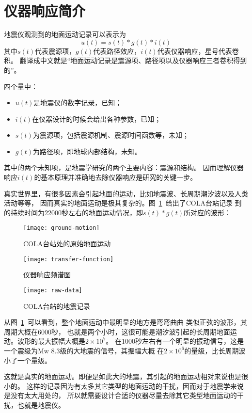 \section{仪器响应简介}
地震仪观测到的地面运动记录可以表示为
\[  u(t) = s(t) * g(t) * i(t) \]
其中$s(t)$代表震源项，$g(t)$代表路径效应，$i(t)$代表仪器响应，星号代表卷积。
翻译成中文就是“地面运动记录是震源项、路径项以及仪器响应三者卷积得到的”。

四个量中：
\begin{itemize}
\item $u(t)$是地震仪的数字记录，已知；
\item $i(t)$在仪器设计的时候会给出各种参数，已知；
\item $s(t)$为震源项，包括震源机制、震源时间函数等，未知；
\item $g(t)$为路径项，即地球内部结构，未知。
\end{itemize}
其中的两个未知项，是地震学研究的两个主要内容：震源和结构。
因而理解仪器响应$i(t)$的基本原理并准确地去除仪器响应是研究的关键一步。

真实世界里，有很多因素会引起地面的运动，比如地震波、长周期潮汐波以及人类活动等等，
因而真实的地面运动是极其复杂的。图~\ref{fig:ground-motion}~给出了COLA台站记录
到的持续时间为22000秒左右的地面运动情况，即$s(t)*g(t)$所对应的波形：

\begin{figure}[H]
\centering
\texttt{[image: ground-motion]}
\caption{COLA台站处的原始地面运动}
\label{fig:ground-motion}
\end{figure}

\begin{figure}[H]
\centering
\texttt{[image: transfer-function]}
\caption{仪器响应频谱图}
\label{fig:transfer-function}
\end{figure}

\begin{figure}[H]
\centering
\texttt{[image: raw-data]}
\caption{COLA台站的地震记录}
\end{figure}

从图~\ref{fig:ground-motion}~可以看到，整个地面运动中最明显的地方是弯弯曲曲
类似正弦的波形，其周期大概在6000秒，
也就是两个小时，这很可能是潮汐波引起的长周期地面运动。波形的最大振幅大概是$2\times10^7$。
在1000秒左右有一个明显的振动信号，这是一个震级为Mw 8.3级的大地震的信号，其振幅大概
在$2\times10^6$的量级，比长周期波小了一个量级。

这就是真实的地面运动。即便是如此大的地震，其引起的地面运动相对来说也是很小的。
这样的记录因为有太多其它类型的地面运动的干扰，因而对于地震学来说是没有太大用处的，
所以就需要设计合适的仪器尽量去除其它类型地面运动的干扰，也就是地震仪。

